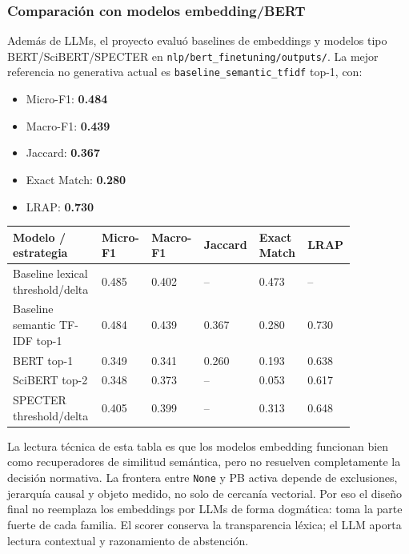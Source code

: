 \subsubsection*{Comparación con modelos embedding/BERT}

Además de LLMs, el proyecto evaluó baselines de embeddings y modelos tipo BERT/SciBERT/SPECTER en \texttt{nlp/bert\_finetuning/outputs/}. La mejor referencia no generativa actual es \texttt{baseline\_semantic\_tfidf} top-1, con:

\begin{itemize}
\item Micro-F1: \textbf{0.484}
\item Macro-F1: \textbf{0.439}
\item Jaccard: \textbf{0.367}
\item Exact Match: \textbf{0.280}
\item LRAP: \textbf{0.730}
\end{itemize}

\begin{center}
\scriptsize
\setlength{\tabcolsep}{4pt}
\renewcommand{\arraystretch}{1.15}
\begin{tabular}{p{0.25\linewidth}p{0.12\linewidth}p{0.12\linewidth}p{0.12\linewidth}p{0.12\linewidth}p{0.12\linewidth}}
\toprule
Modelo / estrategia & Micro-F1 & Macro-F1 & Jaccard & Exact Match & LRAP \\
\midrule
Baseline lexical threshold/delta & 0.485 & 0.402 & -- & 0.473 & -- \\
Baseline semantic TF-IDF top-1 & 0.484 & 0.439 & 0.367 & 0.280 & 0.730 \\
BERT top-1 & 0.349 & 0.341 & 0.260 & 0.193 & 0.638 \\
SciBERT top-2 & 0.348 & 0.373 & -- & 0.053 & 0.617 \\
SPECTER threshold/delta & 0.405 & 0.399 & -- & 0.313 & 0.648 \\
\bottomrule
\end{tabular}
\end{center}

La lectura técnica de esta tabla es que los modelos embedding funcionan bien como recuperadores de similitud semántica, pero no resuelven completamente la decisión normativa. La frontera entre \texttt{None} y PB activa depende de exclusiones, jerarquía causal y objeto medido, no solo de cercanía vectorial. Por eso el diseño final no reemplaza los embeddings por LLMs de forma dogmática: toma la parte fuerte de cada familia. El scorer conserva la transparencia léxica; el LLM aporta lectura contextual y razonamiento de abstención.

